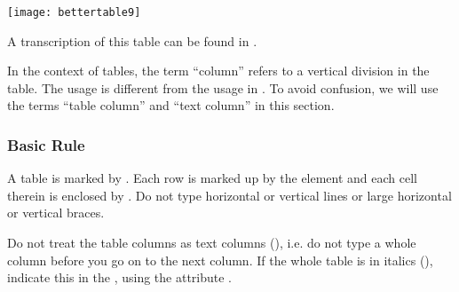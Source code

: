 \texttt{[image: bettertable9]}

\begin{crossref}
A transcription of this table can be found in .
\end{crossref}

\vspace{3mm}
\begin{note}
In the context of tables, the term “column” refers to a vertical division in the table. The usage is different from the usage in . To avoid confusion, we will use the terms “table column” and “text column” in this section.
\end{note}

\subsubsection{Basic Rule}
\label{section tables basic rule}

\begin{mainrule}
  A table is marked by . Each row is marked up by the element  and each cell therein is enclosed by . Do not type horizontal or vertical lines or large horizontal or vertical braces.
\end{mainrule}

\begin{clarification}
Do not treat the table columns as text columns (), i.e. do not type a whole column before you go on to the next column. If the whole table is in italics (), indicate this in the , using the attribute .
\end{clarification}


